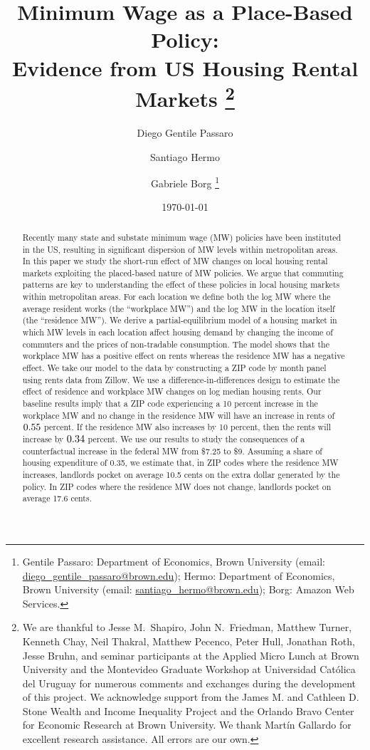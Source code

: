 \documentclass{article}
\title{ Minimum Wage as a Place-Based Policy: \\
        Evidence from US Housing Rental Markets%
        \thanks{We are thankful to Jesse M.\ Shapiro, John N.\ Friedman, 
        Matthew Turner, Kenneth Chay, Neil Thakral, Matthew Pecenco, Peter Hull,
        Jonathan Roth, Jesse Bruhn, 
        and seminar participants at the Applied Micro Lunch at Brown
        University and the Montevideo Graduate Workshop at Universidad Católica 
        del Uruguay
        for numerous comments and exchanges during the development of 
        this project.
        We acknowledge support from the James M. and Cathleen D. Stone Wealth and Income Inequality Project and the Orlando Bravo Center for Economic Research at Brown University.
        We thank Martín Gallardo for excellent research assistance.
        All errors are our own.}}
\author{Diego Gentile Passaro \and Santiago Hermo \and Gabriele Borg
        \footnote{Gentile Passaro: Department of Economics, Brown University 
        (email: \url{diego_gentile_passaro@brown.edu}); 
        Hermo: Department of Economics, Brown University 
        (email: \url{santiago_hermo@brown.edu});
        Borg: Amazon Web Services.}}
\date{\today}
\begin{document}
\maketitle

\begin{abstract}
    \noindent
    Recently many state and substate minimum wage (MW) policies have been 
    instituted in the US, resulting in significant dispersion of MW levels 
    within metropolitan areas.
    In this paper we study the short-run effect of MW changes on local housing 
    rental markets exploiting the placed-based nature of MW policies.
    We argue that commuting patterns are key to understanding the effect of these
    policies in local housing markets within metropolitan areas.
    For each location we define both
    the log MW where the average resident works (the ``workplace MW'')
    and the log MW in the location itself (the ``residence MW'').
    We derive a partial-equilibrium model of a housing market
    in which MW levels in each location affect housing demand by 
    changing the income of commuters and the prices of non-tradable consumption. 
    The model shows that the workplace MW has a positive effect on rents 
    whereas the residence MW has a negative effect.
    We take our model to the data by constructing a ZIP code by month panel 
    using rents data from Zillow.
    We use a difference-in-differences design to estimate the effect of 
    residence and workplace MW changes on log median housing rents.
    Our baseline results imply that a ZIP code experiencing a 
    10 percent increase in the workplace MW and 
    no change in the residence MW will have an increase in rents of 
    $\textnormal{0.55}$ percent.
    If the residence MW also increases by 10 percent, then 
    the rents will increase by $\textnormal{0.34}$ percent.
    We use our results to study the consequences of a counterfactual increase in 
    the federal MW from \$7.25 to \$9.
    Assuming a share of housing expenditure of 0.35,
    we estimate that, in ZIP codes where the residence MW increases, 
    landlords pocket on average 10.5 cents on the extra dollar generated by the
    policy.
    In ZIP codes where the residence MW does not change, landlords pocket 
    on average 17.6 cents.
\end{abstract}

\vspace{5mm}
\end{document}
